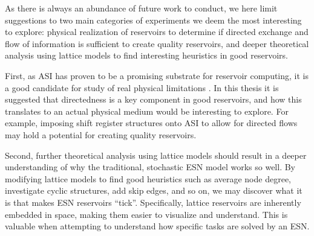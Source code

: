 As there is always an abundance of future work to conduct, we here limit
suggestions to two main categories of experiments we deem the most interesting
to explore: physical realization of reservoirs to determine if directed exchange
and flow of information is sufficient to create quality reservoirs, and deeper
theoretical analysis using lattice models to find interesting heuristics in good
reservoirs.

First, as ASI has proven to be a promising substrate for reservoir computing, it
is a good candidate for study of real physical limitations
\cite{jensen_reservoir_2020}. In this thesis it is suggested that directedness
is a key component in good reservoirs, and how this translates to an actual
physical medium would be interesting to explore. For example, imposing shift
register structures onto ASI to allow for directed flows may hold a potential
for creating quality reservoirs.

Second, further theoretical analysis using lattice models should result in a
deeper understanding of why the traditional, stochastic ESN model works so
well. By modifying lattice models to find good heuristics such as average node
degree, investigate cyclic structures, add skip edges, and so on, we may
discover what it is that makes ESN reservoirs ``tick''. Specifically, lattice
reservoirs are inherently embedded in space, making them easier to visualize and
understand. This is valuable when attempting to understand how specific tasks
are solved by an ESN.

